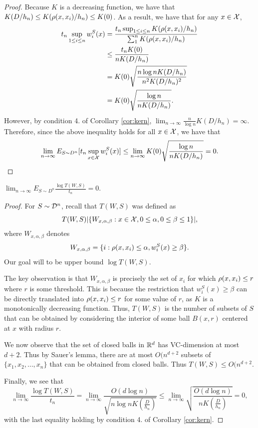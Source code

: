 \begin{proof}
Because $K$ is a decreasing function, we have that $K(D / h_n) \leq K(\rho(x, x_i) / h_n) \leq K(0)$. As a result, we have that for any $x \in \mathcal X$, 
\begin{equation*}
\begin{split}
t_n\sup_{1 \leq i \leq n}w_i^S(x) &= \frac{t_n\sup_{1 \leq i \leq n}K(\rho(x, x_i)/h_n)}{\sum_1^n K(\rho(x, x_i)/h_n)} \\
&\leq \frac{t_n K(0)}{nK(D/h_n)} \\
&= K(0)\sqrt{\frac{n\log nK(D/h_n)}{n^2K(D/h_n)^2}} \\
&= K(0)\sqrt{\frac{\log n}{nK(D/h_n)}}.
\end{split}
\end{equation*}
However, by condition 4. of Corollary \ref{cor:kern}, $\lim_{n \to \infty} \frac{n}{\log n}K(D/h_n) = \infty$. Therefore, since the above inequality holds for all $ x\in \mathcal X$, we have that $$\lim_{n \to \infty} E_{S \sim D^n}[t_n \sup_{x \in \mathcal X} w_i^S(x)] \leq \lim_{n \to \infty} K(0)\sqrt{\frac{\log n}{nK(D/h_n)}} = 0.$$
\end{proof}

\begin{lem}\label{cl:kern_vc}
$\lim_{n \to \infty} E_{S \sim D^n}\frac{\log T(W,S)}{t_n} = 0$.
\end{lem}

\begin{proof}
For $S \sim {\mathcal D}^n$, recall that $T(W, S)$ was defined as $$T(W, S) |\{W_{x, \alpha, \beta}: x \in \mathcal X, 0 \leq \alpha, 0 \leq \beta \leq 1\}|,$$ where $W_{x, \alpha, \beta}$ denotes $$W_{x, \alpha, \beta} = \{i: \rho(x, x_i) \leq \alpha, w_i^S(x) \geq \beta\}.$$ Our goal will to be upper bound $\log T(W, S)$. 

The key observation is that $W_{x, \alpha, \beta}$ is precisely the set of $x_i$ for which $\rho(x, x_i) \leq r$ where $r$ is some threshold. This is because the restriction that $w_i^S(x) \geq \beta$ can be directly translated into $\rho(x, x_i) \leq r$ for some value of $r$, as $K$ is a monotonically decreasing function. Thus, $T(W,S)$ is the number of subsets of $S$ that can be obtained by considering the interior of some ball $B(x,r)$ centered at $x$ with radius $r$.

We now observe that the set of closed balls in $\mathbb R^d$ has VC-dimension at most $d+2$. Thus by Sauer's lemma, there are at most $O(n^{d+2}$ subsets of $\{x_1, x_2, \dots, x_n\}$ that can be obtained from closed balls. Thus $T(W,S) \leq O(n^{d+2}$. 

Finally, we see that $$\lim_{n \to \infty} \frac{\log T(W,S)}{t_n} = \lim_{n \to \infty} \frac{O(d\log n)}{\sqrt{n\log nK(\frac{D}{h_n})}} \leq \lim_{n \to \infty} \sqrt{\frac{O(d \log n)}{nK(\frac{D}{h_n})}} = 0,$$ with the last equality holding by condition 4. of Corollary \ref{cor:kern}. 
\end{proof}

